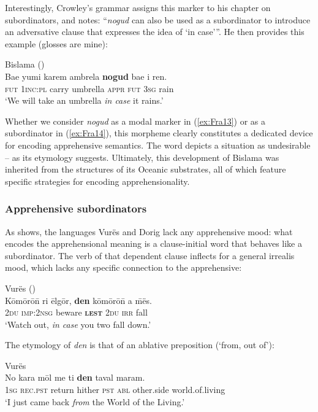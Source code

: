 \documentclass[output=paper,colorlinks,citecolor=brown]{langscibook}
\begin{document}
Interestingly, Crowley's grammar assigns this marker to his chapter on subordinators, and notes: ``\textit{nogud} can also be used as a subordinator to introduce an adversative clause that expresses the idea of `in case'{''}. He then provides this example (glosses are mine):


\ea \label{ex:Fra14} \textnormal{Bislama (\citealt[186]{Crowley2004})} \\
\gll  Bae yumi karem ambrela \textbf{nogud} bae i ren. \\
\textsc{fut} \textsc{1inc:pl} carry umbrella \textsc{appr} \textsc{fut} \textsc{3sg} rain \\
\glt `We will take an umbrella \textit{in case} it rains.' 
\z


Whether we consider \textit{nogud} as a modal marker in (\ref{ex:Fra13}) or as a subordinator in (\ref{ex:Fra14}), this morpheme clearly constitutes a dedicated device for encoding apprehensive semantics. The word depicts a situation as undesirable -- as its etymology suggests. Ultimately, this development of Bislama was inherited from the structures of its Oceanic substrates, all of which feature specific strategies for encoding apprehensionality.



\subsubsection{Apprehensive subordinators}
\label{subsubsec:appsub}

 
As  shows, the languages Vurës and Dorig lack any apprehensive mood: what encodes the apprehensional meaning is a clause-initial word that behaves like a subordinator. The verb of that dependent clause inflects for a general \mbox{irrealis} mood, which lacks any specific connection to the apprehensive:
 
\ea \label{ex:Fra15} \textnormal{Vurës (\citealt{Malau2021}) }\\
\gll Kōmōrō\={n} ri ēlgōr, \textbf{den} kōmōrō\={n} a \={m}ës. \\
\textsc{2du} \textsc{imp:2nsg} beware \textsc{\textbf{lest}} \textsc{2du} \textsc{irr} fall \\
\glt `Watch out, \textit{in case} you two fall down.' 
\z

\noindent The etymology of \textit{den} is that of an ablative preposition (`from, out of'):
 
\ea \label{ex:Fra16} \textnormal{Vurës } \\
\gll No kara mōl me ti \textbf{den} taval maram. \\
\textsc{1sg} \textsc{rec.pst} return hither \textsc{pst} \textsc{abl} other.side world.of.living \\
\glt `I just came back \textit{from} the World of the Living.' 
\z
\end{document}
